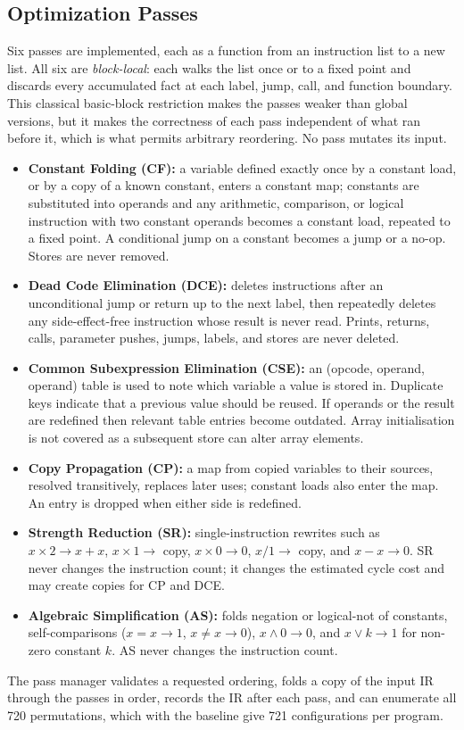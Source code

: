 \documentclass[conference,a4paper]{IEEEtran}
\begin{document}
\subsection{Optimization Passes}
\label{sec:passes}
Six passes are implemented, each as a function from an instruction list to a new list. All six are \emph{block-local}: each walks the list once or to a fixed point and discards every accumulated fact at each label, jump, call, and function boundary. This classical basic-block restriction makes the passes weaker than global versions, but it makes the correctness of each pass independent of what ran before it, which is what permits arbitrary reordering. No pass mutates its input.
\begin{itemize}
    \item \textbf{Constant Folding (CF):} a variable defined exactly once by a constant load, or by a copy of a known constant, enters a constant map; constants are substituted into operands and any arithmetic, comparison, or logical instruction with two constant operands becomes a constant load, repeated to a fixed point. A conditional jump on a constant becomes a jump or a no-op. Stores are never removed.
    \item \textbf{Dead Code Elimination (DCE):} deletes instructions after an unconditional jump or return up to the next label, then repeatedly deletes any side-effect-free instruction whose result is never read. Prints, returns, calls, parameter pushes, jumps, labels, and stores are never deleted.
    \item \textbf{Common Subexpression Elimination (CSE):} an (opcode, operand, operand) table is used to note which variable a value is stored in. Duplicate keys indicate that a previous value should be reused. If operands or the result are redefined then relevant table entries become outdated. Array initialisation is not covered as a subsequent store can alter array elements.
    \item \textbf{Copy Propagation (CP):} a map from copied variables to their sources, resolved transitively, replaces later uses; constant loads also enter the map. An entry is dropped when either side is redefined.
    \item \textbf{Strength Reduction (SR):} single-instruction rewrites such as $x \times 2 \to x + x$, $x \times 1 \to$ copy, $x \times 0 \to 0$, $x / 1 \to$ copy, and $x - x \to 0$. SR never changes the instruction count; it changes the estimated cycle cost and may create copies for CP and DCE.
    \item \textbf{Algebraic Simplification (AS):} folds negation or logical-not of constants, self-comparisons ($x = x \to 1$, $x \neq x \to 0$), $x \wedge 0 \to 0$, and $x \vee k \to 1$ for non-zero constant $k$. AS never changes the instruction count.
\end{itemize}
The pass manager validates a requested ordering, folds a copy of the input IR through the passes in order, records the IR after each pass, and can enumerate all 720 permutations, which with the baseline give 721 configurations per program.
\end{document}
